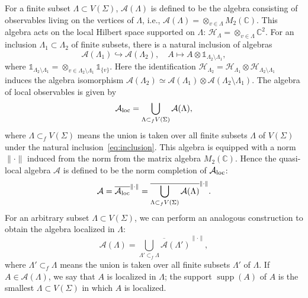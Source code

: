 \documentclass[a4paper,11pt]{article}
\theoremstyle{definition}
\theoremstyle{remark}
\theoremstyle{remark}
\begin{document}
For a finite subset $\Lambda\subset V(\Sigma)$, $\mathcal{A}(\Lambda)$ is defined to be the algebra consisting of observables living on the vertices of $\Lambda$, i.e., $\mathcal{A}(\Lambda) = \otimes_{v\in \Lambda} M_2(\mathbb{C})$. This algebra acts on the local Hilbert space supported on $\Lambda$: $\mathcal{H}_\Lambda = \otimes_{v\in \Lambda} \mathbb{C}^2$. For an inclusion $\Lambda_1\subset \Lambda_2$ of finite subsets, there is a natural inclusion of algebras 
\begin{equation} \label{eq:inclusion}
    \mathcal{A}(\Lambda_1) \hookrightarrow \mathcal{A}(\Lambda_2), \quad A\mapsto A\otimes \mathds{1}_{\Lambda_2\setminus \Lambda_1},
\end{equation}
where $\mathds{1}_{\Lambda_2\setminus \Lambda_1} = \otimes_{v\in {\Lambda_2\setminus \Lambda_1}}\mathds{1}_{\{v\}}$. 
Here the identification $\mathcal{H}_{\Lambda_2} = \mathcal{H}_{\Lambda_1} \otimes \mathcal{H}_{\Lambda_2 \setminus \Lambda_1}$ induces the algebra isomorphism $\mathcal{A}({\Lambda_2}) \simeq \mathcal{A}({\Lambda_1}) \otimes \mathcal{A}({\Lambda_2 \setminus \Lambda_1})$.
The algebra of local observables is given by 
\begin{equation*}
    \mathcal{A}_{\rm loc} = \bigcup_{\Lambda\subset_f V(\Sigma)} \mathcal{A}(\Lambda),
\end{equation*}
where $\Lambda\subset_fV(\Sigma)$ means the union is taken over all finite subsets $\Lambda$ of $V(\Sigma)$ under the natural inclusion~\eqref{eq:inclusion}. 
This algebra is equipped with a norm $\|\cdot \|$ induced from the norm from the matrix algebra $M_2(\mathbb{C})$. 
Hence the quasi-local algebra $\mathcal{A}$ is defined to be the norm completion of $\mathcal{A}_{\rm loc}$:
\begin{equation*}
    \mathcal{A} = \overline{\mathcal{A}_{\rm loc}}^{\|\cdot\|} = \overline{\bigcup_{\Lambda\subset_f V(\Sigma)} \mathcal{A}(\Lambda)}^{\|\cdot\|}. 
\end{equation*}
For an arbitrary subset $\Lambda\subset V(\Sigma)$, we can perform an analogous construction to obtain the algebra localized in $\Lambda$: 
\begin{equation*}
    \mathcal{A}(\Lambda) = \overline{\bigcup_{\Lambda'\subset_f \Lambda} \mathcal{A}(\Lambda')}^{\|\cdot\|},
\end{equation*}
where $\Lambda'\subset_f\Lambda$ means the union is taken over all finite subsets $\Lambda'$ of $\Lambda$.  If $A\in \mathcal{A}(\Lambda)$, we say that $A$ is localized in $\Lambda$; the support $\operatorname{supp}(A)$ of $A$ is the smallest $\Lambda\subset V(\Sigma)$ in which $A$ is localized. 
\end{document}

